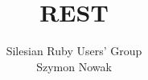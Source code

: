 \documentclass[16pt]{beamer}
\author{Silesian Ruby Users' Group\\
  \footnotesize{Szymon Nowak}}
\title{REST}
\begin{document}
\frame{\titlepage}




\end{document}
